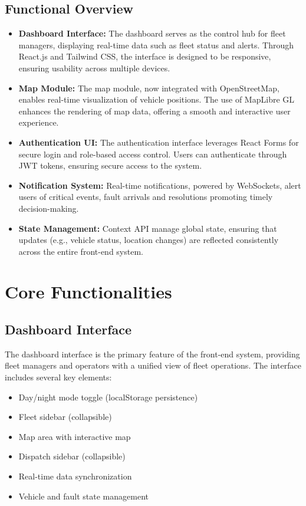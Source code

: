 \documentclass[12pt,a4paper]{report}
\begin{document}
\subsection{Functional Overview}
\begin{itemize}
    \item \textbf{Dashboard Interface:} The dashboard serves as the control hub for fleet managers, displaying real-time data such as fleet status and alerts. Through React.js and Tailwind CSS, the interface is designed to be responsive, ensuring usability across multiple devices.
    \item \textbf{Map Module:} The map module, now integrated with OpenStreetMap, enables real-time visualization of vehicle positions. The use of MapLibre GL enhances the rendering of map data, offering a smooth and interactive user experience.
    \item \textbf{Authentication UI:} The authentication interface leverages React Forms for secure login and role-based access control. Users can authenticate through JWT tokens, ensuring secure access to the system.
    \item \textbf{Notification System:} Real-time notifications, powered by WebSockets, alert users of critical events, fault arrivals and resolutions promoting timely decision-making.
    \item \textbf{State Management:} Context API manage global state, ensuring that updates (e.g., vehicle status, location changes) are reflected consistently across the entire front-end system.
\end{itemize}

\section{Core Functionalities}

\subsection{Dashboard Interface}
The dashboard interface is the primary feature of the front-end system, providing fleet managers and operators with a unified view of fleet operations. The interface includes several key elements:
\begin{itemize}
    \item Day/night mode toggle (localStorage persistence)
    \item Fleet sidebar (collapsible)
    \item Map area with interactive map
    \item Dispatch sidebar (collapsible)
    \item Real-time data synchronization
    \item Vehicle and fault state management
\end{itemize}
\end{document}
